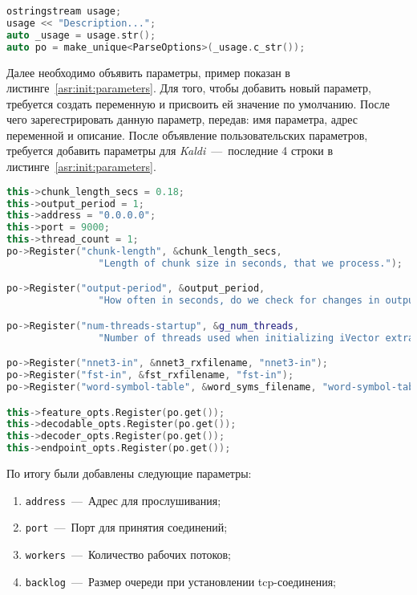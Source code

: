 \begin{lstlisting}[caption={Обработка аргументов},label={asr:init:options},language=C++]
ostringstream usage;
usage << "Description...";
auto _usage = usage.str();
auto po = make_unique<ParseOptions>(_usage.c_str());

\end{lstlisting}

Далее необходимо объявить параметры, пример показан в листинге~\ref{asr:init:parameters}.
Для того, чтобы добавить новый параметр, требуется создать переменную и присвоить ей
значение по умолчанию. После чего зарегестрировать данную параметр, передав:
имя параметра, адрес переменной и описание. После объявление пользовательских
параметров, требуется добавить параметры для \textit{Kaldi}~---~последние 4 строки в
листинге~\ref{asr:init:parameters}.

\begin{lstlisting}[caption={Пример объявление параметров},label={asr:init:parameters},language=C++]
this->chunk_length_secs = 0.18;
this->output_period = 1;
this->address = "0.0.0.0";
this->port = 9000;
this->thread_count = 1;
po->Register("chunk-length", &chunk_length_secs,
                "Length of chunk size in seconds, that we process.");

po->Register("output-period", &output_period,
                "How often in seconds, do we check for changes in output.");

po->Register("num-threads-startup", &g_num_threads,
                "Number of threads used when initializing iVector extractor.");

po->Register("nnet3-in", &nnet3_rxfilename, "nnet3-in");
po->Register("fst-in", &fst_rxfilename, "fst-in");
po->Register("word-symbol-table", &word_syms_filename, "word-symbol-table");

this->feature_opts.Register(po.get());
this->decodable_opts.Register(po.get());
this->decoder_opts.Register(po.get());
this->endpoint_opts.Register(po.get());

\end{lstlisting}

По итогу были добавлены следующие параметры:
\begin{enumerate}
    \item \texttt{address}~---~Адрес для прослушивания;
    \item \texttt{port}~---~Порт для принятия соединений;
    \item \texttt{workers}~---~Количество рабочих потоков;
    \item \texttt{backlog}~---~Размер очереди при установлении tcp-соединения;
\end{enumerate}

